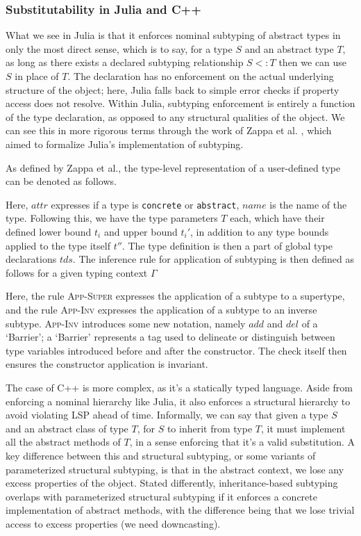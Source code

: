 \subsubsection{Substitutability in Julia and C++}

What we see in Julia is that it enforces nominal subtyping of abstract types in only the most direct sense, which is to say, for a type $S$ and an abstract type $T$, as long as there exists a declared subtyping relationship $S <: T$ then we can use $S$ in place of $T$. The declaration has no enforcement on the actual underlying structure of the object; here, Julia falls back to simple error checks if property access does not resolve. Within Julia, subtyping enforcement is entirely a function of the type declaration, as opposed to any structural qualities of the object. We can see this in more rigorous terms through the work of Zappa et al. \cite{Zappa2018Julia}, which aimed to formalize Julia's implementation of subtyping. 

\begin{definition}
 As defined by Zappa et al., the type-level representation of a user-defined type can be denoted as follows.
  
 Here, $attr$ expresses if a type is \texttt{concrete} or \texttt{abstract}, $name$ is the name of the type. Following this, we have the type parameters $T$ each, which have their defined lower bound $t_i$ and upper bound $t_i'$, in addition to any type bounds applied to the type itself $t''$. The type definition is then a part of global type declarations $tds$. The inference rule for application of subtyping is then defined as follows for a given typing context $\Gamma$
  
 Here, the rule \textsc{App-Super} expresses the application of a subtype to a supertype, and the rule \textsc{App-Inv} expresses the application of a subtype to an inverse subtype. \textsc{App-Inv} introduces some new notation, namely $add$ and $del$ of a `Barrier'; a `Barrier' represents a tag used to delineate or distinguish between type variables introduced before and after the constructor. The check itself then ensures the constructor application is invariant.
\end{definition}

The case of C++ is more complex, as it's a statically typed language. Aside from enforcing a nominal hierarchy like Julia, it also enforces a structural hierarchy to avoid violating LSP ahead of time. Informally, we can say that given a type $S$ and an abstract class of type $T$, for $S$ to inherit from type $T$, it must implement all the abstract methods of $T$, in a sense enforcing that it's a valid substitution. A key difference between this and structural subtyping, or some variants of parameterized structural subtyping, is that in the abstract context, we lose any excess properties of the object. Stated differently, inheritance-based subtyping overlaps with parameterized structural subtyping if it enforces a concrete implementation of abstract methods, with the difference being that we lose trivial access to excess properties (\ie we need downcasting). 




